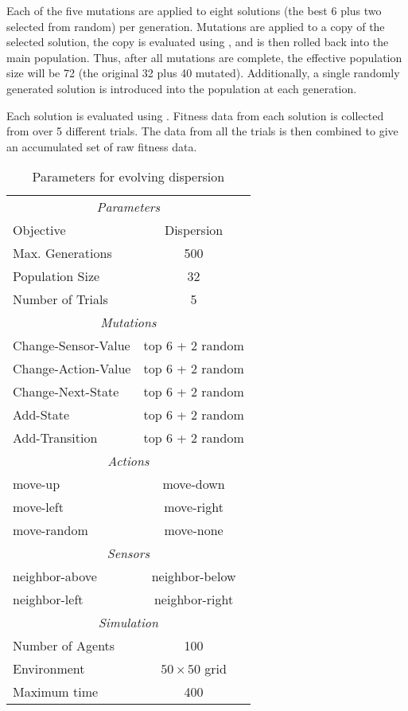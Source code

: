 Each of the five mutations are applied to eight solutions (the best 6 plus two selected from random) per generation.  Mutations are applied to a copy of the selected solution, the copy is evaluated using \SWEEP{}, and is then rolled back into the main population.  Thus, after all mutations are complete, the effective population size will be 72 (the original 32 plus 40 mutated).  Additionally, a single randomly generated solution is introduced into the population at each generation.

Each solution is evaluated using \SWEEP{}.  Fitness data from each solution is collected from \SWEEP over 5 different trials.  The data from all the trials is then combined to give an accumulated set of raw fitness data.

\begin{table}[ht]
  \small
  \centering
  \begin{tabular}{|lc|}
    \hline
    \multicolumn{2}{|c|}{\em{Parameters}} \\
    Objective & Dispersion \\
    Max. Generations & 500 \\
    Population Size & 32 \\
    Number of Trials & 5 \\
    \hline
    \hline
    \multicolumn{2}{|c|}{\em{Mutations}} \\
    Change-Sensor-Value & top 6 + 2 random \\
    Change-Action-Value & top 6 + 2 random \\
    Change-Next-State & top 6 + 2 random \\
    Add-State & top 6 + 2 random \\
    Add-Transition & top 6 + 2 random \\
    \hline
    \hline
    \multicolumn{2}{|c|}{\em{Actions}} \\
    move-up     & move-down  \\
    move-left   & move-right \\
    move-random & move-none  \\
    \hline
    \multicolumn{2}{|c|}{\em{Sensors}} \\
    neighbor-above & neighbor-below \\
    neighbor-left  & neighbor-right \\
    \hline
    \hline
    \multicolumn{2}{|c|}{\em{Simulation}} \\
    Number of Agents & 100 \\
    Environment & $50 \times 50$ grid \\
    Maximum time & 400 \\
    \hline 
  \end{tabular}
  \caption{Parameters for evolving dispersion}
  \label{tab:DispersionParameters}
\end{table}


